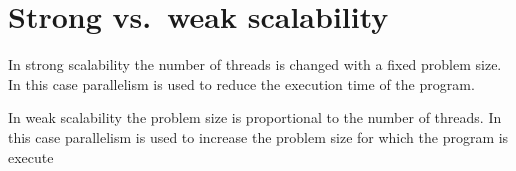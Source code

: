 \section{Strong vs.\ weak scalability}%
\label{sec:strong_vs_weak_scalability}


In strong scalability  the  number  of  threads  is  changed  with  a  fixed  problem  size.   In  this  case parallelism is used to reduce the execution time of the program.

In weak scalability the problem size is proportional to the number of threads. In this case parallelism is used to increase the problem size for which the program is execute

